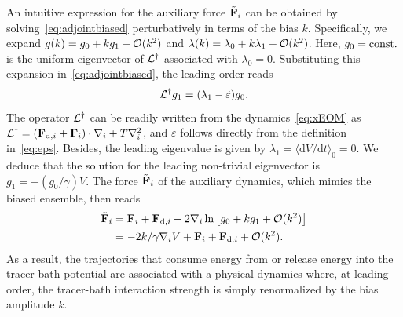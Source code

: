 \documentclass[pre, superscriptaddress, twocolumn,pre]{revtex4-1}
\newcommand{\dd}{\text{d}}
\begin{document}
An intuitive expression for the auxiliary force $\tilde{\bf F}_i$ can be obtained by solving~\eqref{eq:adjointbiased} perturbatively in terms of the bias $k$. Specifically, we expand $g(k)=g_0 + k g_1 + {\cal O}(k^2)$ and $\lambda(k)= \lambda_0 + k \lambda_1 + {\cal O}(k^2)$. Here, $g_0 = {\rm const.}$ is the uniform eigenvector of ${\cal L}^\dagger$ associated with $\lambda_0=0$. Substituting this expansion in~\eqref{eq:adjointbiased}, the leading order reads
\begin{equation}
		{\cal L}^\dagger g_1 = (\lambda_1 - \dot\varepsilon) g_0 .
\end{equation}
The operator ${\cal L}^\dagger$ can be readily written from the dynamics~\eqref{eq:xEOM} as ${\cal L}^\dagger = ({\bf F}_{{\rm d},i}+{\bf F}_i) \cdot \nabla_i + T \nabla^2_i$, and $\dot\varepsilon$ follows directly from the definition in~\eqref{eq:eps}. Besides, the leading eigenvalue is given by $\lambda_1 = \langle\dd V/\dd t\rangle_0 = 0$. We deduce that the solution for the leading non-trivial eigenvector is $g_1 = -(g_0/\gamma) V$. The force $\tilde{\bf F}_i$ of the auxiliary dynamics, which mimics the biased ensemble, then reads
\begin{equation}\label{eq:effectivedynamics}
	\begin{aligned}
		\tilde{\bf F}_i &= {\bf F}_i + {\bf F}_{{\rm d},i} +2 \nabla_i \ln \left[ g_0 + k g_1 + {\cal O}(k^2) \right]
		\\
		&= -2 k/\gamma \nabla_i V + {\bf F}_i+ {\bf F}_{{\rm d},i} + {\cal O}(k^2) .
	\end{aligned}
\end{equation}
As a result, the trajectories that consume energy from or release energy into the tracer-bath potential are associated with a physical dynamics where, at leading order, the tracer-bath interaction strength is simply renormalized by the bias amplitude $k$.
\end{document}
